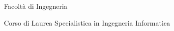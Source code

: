 \begin{titlepage}
\pagestyle{empty}

\begingroup
\vspace*{-7\topskip}


\begin{figure}[!h]
\begin{center}
\end{center}
\end{figure}

\begin{center}
        \LARGE{\rm\expandafter{Facolt\`a di Ingegneria}}\par
        \large\expandafter{Corso di Laurea Specialistica in Ingegneria Informatica}\par
\end{center}


\end{titlepage}
